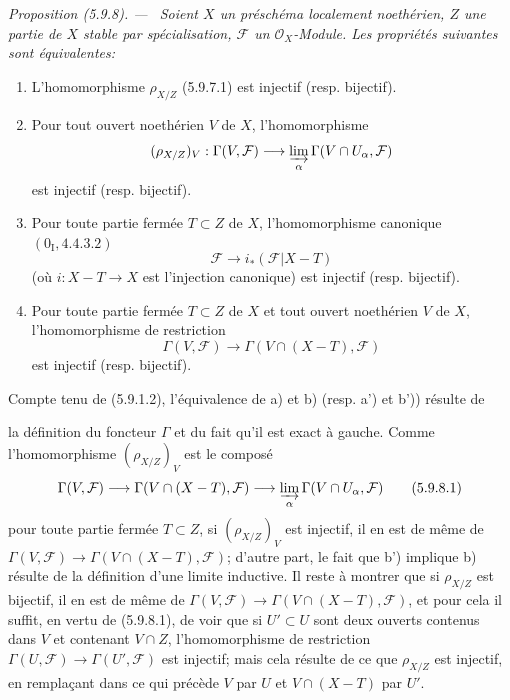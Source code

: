 \documentclass[10pt,oneside]{book}
\makeatletter
\newcommand{\oldpage}[2][]{%
  \setcounter{footnote}{0}%
  \marginpar{\scriptsize\textbf{#1}~|~#2}\ignorespaces}
\newenvironment{proposition}[1][]{%
  \par\medskip\noindent\itshape Proposition (#1). ---\ }{\par}
\newcommand{\EGAReaderTarget}[2]{\hypertarget{#1}{}\@bsphack\begingroup\def\@currentHref{#1}\label{#2}\endgroup\@esphack}
\makeatother
\begin{document}
\begin{proposition}[5.9.8]
\EGAReaderTarget{ega4.c04.prop.5-9-8}{IV.2.s5.9.8-fr}
Soient $X$ un préschéma localement noethérien, $Z$ une partie de $X$ stable
par spécialisation, $\mathcal F$ un $\mathcal O_X$-Module. Les propriétés
suivantes sont équivalentes:
\begin{enumerate}
\item[a)] L'homomorphisme $\rho_{X/Z}$ (5.9.7.1) est injectif
(resp. bijectif).
\item[b)] Pour tout ouvert noethérien $V$ de $X$, l'homomorphisme
\[
(\rho_{X/Z})_V:\Gamma(V,\mathcal F)\longrightarrow
\varinjlim_\alpha\Gamma(V\cap U_\alpha,\mathcal F)
\]
est injectif (resp. bijectif).
\item[a')] Pour toute partie fermée $T\subset Z$ de $X$, l'homomorphisme
canonique $(0_{\mathrm I},4.4.3.2)$
\[
\mathcal F\longrightarrow i_*(\mathcal F|X-T)
\]
(où $i:X-T\to X$ est l'injection canonique) est injectif
(resp. bijectif).
\item[b')] Pour toute partie fermée $T\subset Z$ de $X$ et tout ouvert
noethérien $V$ de $X$, l'homomorphisme de restriction
\[
\Gamma(V,\mathcal F)\longrightarrow
\Gamma(V\cap(X-T),\mathcal F)
\]
est injectif (resp. bijectif).
\end{enumerate}
\end{proposition}

Compte tenu de (5.9.1.2), l'équivalence de a) et b) (resp. a') et b'))
résulte de
\oldpage[IV-2]{112}

la définition du foncteur $\Gamma$ et du fait qu'il est exact à gauche.
Comme l'homomorphisme $(\rho_{X/Z})_V$ est le composé
\begin{equation}
\Gamma(V,\mathcal F)\longrightarrow
\Gamma(V\cap(X-T),\mathcal F)\longrightarrow
\varinjlim_\alpha\Gamma(V\cap U_\alpha,\mathcal F)
\tag{5.9.8.1}\label{IV.2.s5.9.8.1-fr}
\end{equation}
pour toute partie fermée $T\subset Z$, si $(\rho_{X/Z})_V$ est injectif, il
en est de même de
$\Gamma(V,\mathcal F)\to\Gamma(V\cap(X-T),\mathcal F)$; d'autre part, le
fait que b') implique b) résulte de la définition d'une limite inductive. Il
reste à montrer que si $\rho_{X/Z}$ est bijectif, il en est de même de
$\Gamma(V,\mathcal F)\to\Gamma(V\cap(X-T),\mathcal F)$, et pour cela il
suffit, en vertu de (5.9.8.1), de voir que si $U'\subset U$ sont deux
ouverts contenus dans $V$ et contenant $V\cap Z$, l'homomorphisme de
restriction $\Gamma(U,\mathcal F)\to\Gamma(U',\mathcal F)$ est injectif;
mais cela résulte de ce que $\rho_{X/Z}$ est injectif, en remplaçant dans ce
qui précède $V$ par $U$ et $V\cap(X-T)$ par $U'$.
\end{document}

